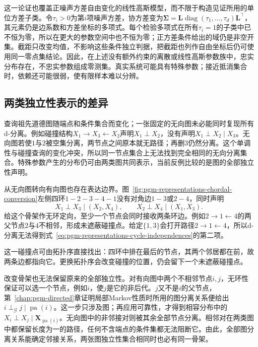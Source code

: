 这一论证也覆盖正噪声方差自由变化的线性高斯模型，而不限于构造见证所用的单位方差子类。令$\tau_i>0$为第$i$项噪声方差，协方差变为$\bm\Sigma=\bm L\operatorname{diag}(\tau_1,\ldots,\tau_d)\bm L^\top$，其元素仍是边系数和方差坐标的多项式。每个检验多项式在所有$\tau_i=1$的子类中已不恒为零，所以在更大的参数空间中也不恒为零；正方差条件给出的域仍是非空开集。截距只改变均值，不影响这些条件独立判据，把截距也列作自由坐标后仍可使用同一零点集结论。因此，在上述没有额外约束的离散或线性高斯参数族中，忠实分布存在，不忠实参数组成零测集。真实系统可能具有特殊参数；接近抵消集合时，依赖还可能很弱，使有限样本难以分辨。

\subsection{两类独立性表示的差异}
\label{sec:pgm-representations-independence-differences}

查询祖先道德图随端点和条件集合而变化；一张固定的无向图未必能同时复现所有d-分离。例如碰撞结构$X_1\to X_3\leftarrow X_2$声明$X_1\perp X_2$，没有声明$X_1\perp X_2\mid X_3$。无向图若使$1$与$2$被空集分离，两节点之间原本就无路径；再删$3$仍然分离。这个单调性与碰撞查询的变化冲突，所以同一节点集合上无法找到完全相同的无向分离集合。特殊参数产生的分布仍可由两类图共同表示，当前反例比较的是图的全部独立性声明。

从无向图转向有向图也存在表达边界。图~\ref{fig:pgm-representations-chordal-conversion}左侧四环$1-2-3-4-1$没有对角边$1-3$或$2-4$，同时声明
\begin{equation}
  X_1\perp X_3\mid(X_2,X_4),\qquad
  X_2\perp X_4\mid(X_1,X_3).
  \label{eq:pgm-representations-cycle-independences}
\end{equation}
给这个骨架作无环定向，至少一个节点会同时接收两条环边。例如$2\to1\leftarrow4$的两父节点$2$与$4$不相邻，形成未遮蔽碰撞点。给定$\{1,3\}$会打开路径$2\to1\leftarrow4$，所以d-分离无法得到式~\eqref{eq:pgm-representations-cycle-independences}的第二项。

这一碰撞点可由拓扑序直接找出：四环中排在最后的节点，其两个邻居都在前，故两条边都指向它。更换拓扑序会改变碰撞的位置，仍会留下一个未遮蔽碰撞点。

改变骨架也无法保留原来的全部独立性。对有向图中两个不相邻节点$i,j$，无环性保证可以选一个节点，例如$i$，使$j$是它的非后代。$j$又不是$i$的父节点，第~\ref{chap:pgm-directed}章证明局部Markov性质时所用的图分离关系便给出$i\perp_{\mathcal G}j\mid\operatorname{pa}(i)$。这一步只涉及图；再应用可靠性，才得到相容分布中的$X_i\perp X_j\mid\bm{X}_{\operatorname{pa}(i)}$。无向图中的非邻接对则被其余全部节点分离。相邻对在两类图中都保留长度为一的路径，任何不含端点的条件集都无法阻断它。由此，全部图分离关系能确定邻接关系，两张图独立性集合相同时也必有同一骨架。

